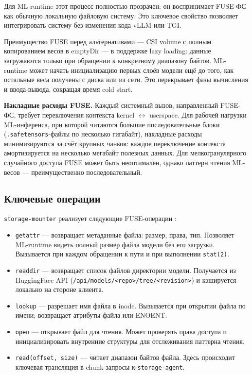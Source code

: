 Для ML-runtime этот процесс полностью прозрачен: он воспринимает FUSE-ФС как обычную локальную файловую систему. Это ключевое свойство позволяет интегрировать систему без изменения кода vLLM или TGI.

Преимущество FUSE перед альтернативами --- CSI volume с полным копированием весов в emptyDir --- в поддержке lazy loading: данные загружаются только при обращении к конкретному диапазону байтов. ML-runtime может начать инициализацию первых слоёв модели ещё до того, как остальные веса получены с диска или из сети. Это перекрывает фазы вычисления и ввода-вывода, сокращая время cold start.

\textbf{Накладные расходы FUSE.} Каждый системный вызов, направленный FUSE-ФС, требует переключения контекста kernel $\leftrightarrow$ userspace. Для рабочей нагрузки ML-инференса, при которой читаются большие последовательные блоки (\texttt{.safetensors}-файлы по несколько гигабайт), накладные расходы минимизируются за счёт крупных чанков: каждое переключение контекста амортизируется на несколько мегабайт полезных данных. Для мелкогранулярного случайного доступа FUSE может быть неоптимален, однако паттерн чтения ML-весов --- преимущественно последовательный.

\subsection*{Ключевые операции}

\texttt{storage-mounter} реализует следующие FUSE-операции \cite{gofuse}:

\begin{itemize}[leftmargin=*]
  \item \texttt{getattr} --- возвращает метаданные файла: размер, права, тип. Позволяет ML-runtime видеть полный размер файла модели без его загрузки. Вызывается при каждом обращении к пути и при выполнении \texttt{stat(2)}.
  \item \texttt{readdir} --- возвращает список файлов директории модели. Получается из HuggingFace API (\texttt{/api/models/<repo>/tree/<revision>}) и кэшируется локально на стороне клиента.
  \item \texttt{lookup} --- разрешает имя файла в inode. Вызывается при открытии файла по имени; возвращает атрибуты файла или ENOENT.
  \item \texttt{open} --- открывает файл для чтения. Может проверять права доступа и инициализировать внутренние структуры для отслеживания паттерна чтения.
  \item \texttt{read(offset, size)} --- читает диапазон байтов файла. Здесь происходит ключевая трансляция в chunk-запросы к \texttt{storage-agent}.
\end{itemize}

